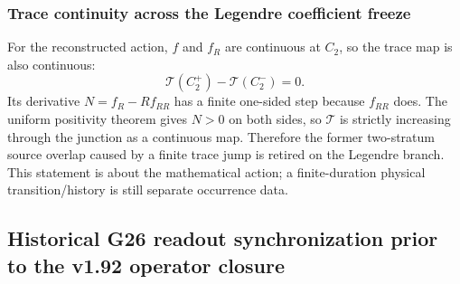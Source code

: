 \documentclass[12pt,a4paper]{article}
\begin{document}
\subsubsection{Trace continuity across the Legendre coefficient freeze}
\label{p8:app:v202-trace-junction}
For the reconstructed action, \(f\) and \(f_R\) are continuous at \(C_2\), so
the trace map is also continuous:
\begin{equation}
\label{p8:eq:v202-trace-junction-jump}
 \boxed{\mathcal T(C_2^+)-\mathcal T(C_2^-)=0.}
\end{equation}
Its derivative \(N=f_R-Rf_{RR}\) has a finite one-sided step because
\(f_{RR}\) does.  The uniform positivity theorem gives \(N>0\) on both
sides, so \(\mathcal T\) is strictly increasing through the junction as a
continuous map.  Therefore the former two-stratum source overlap caused by a
finite trace jump is retired on the Legendre branch.  This statement is about
the mathematical action; a finite-duration physical transition/history is
still separate occurrence data.

\subsection{Historical G26 readout synchronization prior to the v1.92 operator closure}
\label{p9:sec:v192-g26-readout-sync}
\end{document}

